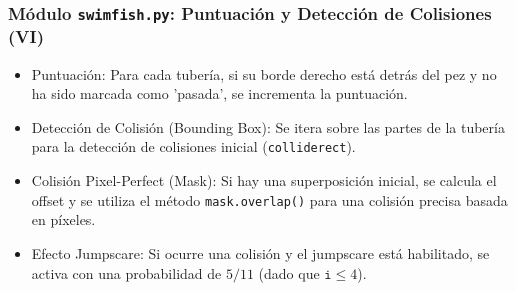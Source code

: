 \documentclass[
	11pt, %
]{beamer}
\begin{document}
\begin{frame}[fragile]\frametitle{Módulo \texttt{swimfish.py}: Puntuación y Detección de Colisiones (VI)}\begin{itemize}\item Puntuación: Para cada tubería, si su borde derecho está detrás del pez y no ha sido marcada como 'pasada', se incrementa la puntuación.\item Detección de Colisión (Bounding Box): Se itera sobre las partes de la tubería para la detección de colisiones inicial (\texttt{colliderect}).\item Colisión Pixel-Perfect (Mask): Si hay una superposición inicial, se calcula el offset y se utiliza el método \texttt{mask.overlap()} para una colisión precisa basada en píxeles.\item Efecto Jumpscare: Si ocurre una colisión y el jumpscare está habilitado, se activa con una probabilidad de $5/11$ (dado que $\texttt{i} \le 4$).\end{itemize}\vspace{4pt}{\scriptsize\begin{verbatim}for tuberia in self.lista_tuberias:# ... Lógica de Puntuación ...
    for tuberia_rect in tuberia.get_rects():
                    if not fish_rect.colliderect(tuberia_rect):
                        continue

                    offset_x = tuberia_rect.left - fish_rect.left
                    offset_y = tuberia_rect.top - fish_rect.top

                    if self.fish.mask.overlap(self.tuberia_mask, (offset_x, offset_y)):
                        self.game_over = True
                        if self.enable_jumpscare:
                            i = random.randint(0, 10)
                            if i <= 4:
                                self.jumpscare.asustar()
                        break
\end{verbatim} } \end{frame}

\end{document}
